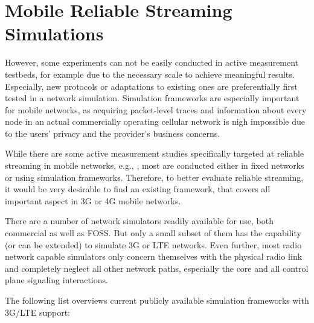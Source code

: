 \section{Mobile Reliable Streaming Simulations}
\label{c6:mobilestreamingtestbed}

However, some experiments can not be easily conducted in active measurement testbeds, for example due to the necessary scale to achieve meaningful results. Especially, new protocols or adaptations to existing ones are preferentially first tested in a network simulation. Simulation frameworks are especially important for mobile networks, as acquiring packet-level traces and information about every node in an actual commercially operating cellular network is nigh impossible due to the users' privacy and the provider's business concerns.

While there are some active measurement studies specifically targeted at reliable streaming in mobile networks, e.g., \cite{Muller:2012:EDA:2151677.2151686}, most are conducted either in fixed networks or using simulation frameworks. Therefore, to better evaluate reliable streaming, it would be very desirable to find an existing framework, that covers all important aspect in 3G or 4G mobile networks.

There are a number of network simulators readily available for use, both commercial as well as \gls{FOSS}. But only a small subset of them has the capability (or can be extended) to simulate \gls{3G} or LTE networks. Even further, most radio network capable simulators only concern themselves with the physical radio link and completely neglect all other network paths, especially the core and all control plane signaling interactions. 

The following list overviews current publicly available simulation frameworks with \gls{3G}/\gls{LTE} support:

